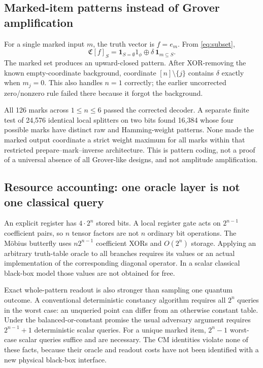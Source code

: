 \documentclass[11pt,a4paper]{article}
\theoremstyle{definition}\newtheorem{definition}[theorem]{Definition}
\theoremstyle{remark}\newtheorem{remark}[theorem]{Remark}
\newcommand{\one}{1_{\phi}}
\numberwithin{equation}{section}
\begin{document}
\subsection{Marked-item patterns instead of Grover amplification}
For a single marked input $m$, the truth vector is $f=e_m$. From \cref{eq:subset},
\begin{equation}\label{eq:marked}
 \mathfrak C[f]_S=\mathbf1_{S=\emptyset}\one
 \oplus\delta\,\mathbf1_{m\subseteq S}.
\end{equation}
The marked set produces an upward-closed pattern. After XOR-removing the known empty-coordinate background, coordinate $[n]\setminus\{j\}$ contains $\delta$ exactly when $m_j=0$. This also handles $n=1$ correctly; the earlier uncorrected zero/nonzero rule failed there because it forgot the background.

All 126 marks across $1\le n\le6$ passed the corrected decoder. A separate finite test of 24,576 identical local splitters on two bits found 16,384 whose four possible marks have distinct raw and Hamming-weight patterns. None made the marked output coordinate a strict weight maximum for all marks within that restricted prepare--mark--inverse architecture. This is pattern coding, not a proof of a universal absence of all Grover-like designs, and not amplitude amplification.

\subsection{Resource accounting: one oracle layer is not one classical query}
An explicit register has $4\cdot2^n$ stored bits. A local register gate acts on $2^{n-1}$ coefficient pairs, so $n$ tensor factors are not $n$ ordinary bit operations. The M\"obius butterfly uses $n2^{n-1}$ coefficient XORs and $O(2^n)$ storage. Applying an arbitrary truth-table oracle to all branches requires its values or an actual implementation of the corresponding diagonal operator. In a scalar classical black-box model those values are not obtained for free.

Exact whole-pattern readout is also stronger than sampling one quantum outcome. A conventional deterministic constancy algorithm requires all $2^n$ queries in the worst case: an unqueried point can differ from an otherwise constant table. Under the balanced-or-constant promise the usual adversary argument requires $2^{n-1}+1$ deterministic scalar queries. For a unique marked item, $2^n-1$ worst-case scalar queries suffice and are necessary. The CM identities violate none of these facts, because their oracle and readout costs have not been identified with a new physical black-box interface.
\end{document}

